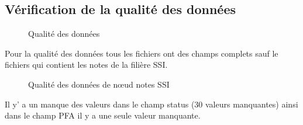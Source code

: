\documentclass{article}
\begin{document}
            \subsection{Vérification de la qualité des données}
            \par
            \begin{figure}[h!]
                \centering
                \caption{Qualité des données}
                \label{fig:11}
            \end{figure}
            Pour la qualité des données tous les fichiers ont des champs complets sauf le fichiers qui contient les notes de la filière SSI.
            \begin{figure}[h!]
                \centering
                \caption{Qualité des données de nœud notes SSI}
                \label{fig:12}
            \end{figure}
            \newpage Il y’ a un manque des valeurs dans le champ status (30 valeurs manquantes) ainsi dans le champ PFA il y a une seule valeur manquante.
\end{document}
